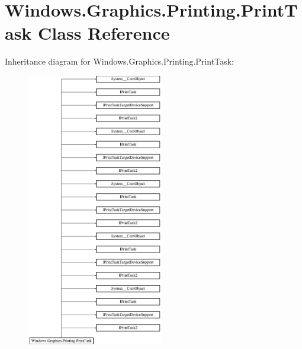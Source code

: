\hypertarget{class_windows_1_1_graphics_1_1_printing_1_1_print_task}{}\section{Windows.\+Graphics.\+Printing.\+Print\+Task Class Reference}
\label{class_windows_1_1_graphics_1_1_printing_1_1_print_task}
Inheritance diagram for Windows.\+Graphics.\+Printing.\+Print\+Task\+:\begin{figure}[H]
\begin{center}
\leavevmode
\includegraphics[height=12.000000cm]{class_windows_1_1_graphics_1_1_printing_1_1_print_task}
\end{center}
\end{figure}
